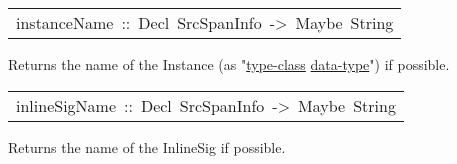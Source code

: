 \begin{haddockdesc}
\item[\begin{tabular}{@{}l}
instanceName\ ::\ Decl\ SrcSpanInfo\ ->\ Maybe\ String
\end{tabular}]\haddockbegindoc
Returns the name of the Instance (as "\url{type-class} \url{data-type}") if possible.\par

\end{haddockdesc}
\begin{haddockdesc}
\item[\begin{tabular}{@{}l}
inlineSigName\ ::\ Decl\ SrcSpanInfo\ ->\ Maybe\ String
\end{tabular}]\haddockbegindoc
Returns the name of the InlineSig if possible.\par

\end{haddockdesc}